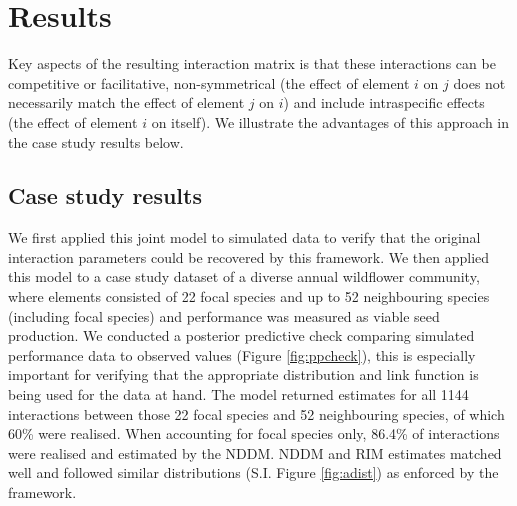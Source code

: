 \documentclass[a4,12pt]{article}
\begin{document}
\section{Results}


    Key aspects of the resulting interaction matrix is that these interactions can be competitive or facilitative, non-symmetrical (the effect of element $i$ on $j$ does not necessarily match the effect of element $j$ on $i$) and include intraspecific effects (the effect of element $i$ on itself). We illustrate the advantages of this approach in the case study results below. 


    \subsection{Case study results}

    We first applied this joint model to simulated data to verify that the original interaction parameters could be recovered by this framework. We then applied this model to a case study dataset of a diverse annual wildflower community, where elements consisted of 22 focal species and up to 52 neighbouring species (including focal species) and performance was measured as viable seed production. We conducted a posterior predictive check comparing simulated performance data to observed values (Figure \ref{fig:ppcheck}), this is especially important for verifying that the appropriate distribution and link function is being used for the data at hand. The model returned estimates for all 1144 interactions between those 22 focal species and 52 neighbouring species, of which 60\% were realised.  When accounting for focal species only, 86.4\% of interactions were realised and estimated by the NDDM. NDDM and RIM estimates matched well and followed similar distributions (S.I. Figure \ref{fig:adist}) as enforced by the framework. 
    



\end{document}
